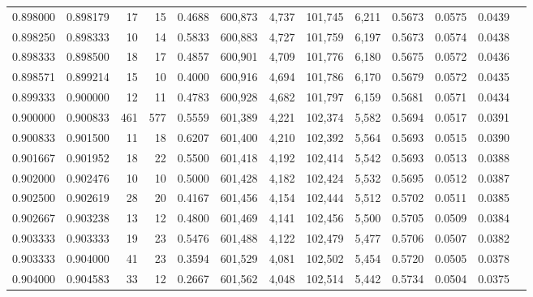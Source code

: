 \begin{tabular}{rrrrrrrrrrrrr}
0.898000 & 0.898179 &    17 &  15 &                                     0.4688 & 600,873 &   4,737 & 101,745 &   6,211 & 0.5673 & 0.0575 & 0.0439 \\
0.898250 & 0.898333 &    10 &  14 &                                     0.5833 & 600,883 &   4,727 & 101,759 &   6,197 & 0.5673 & 0.0574 & 0.0438 \\
0.898333 & 0.898500 &    18 &  17 &                                     0.4857 & 600,901 &   4,709 & 101,776 &   6,180 & 0.5675 & 0.0572 & 0.0436 \\
0.898571 & 0.899214 &    15 &  10 &                                     0.4000 & 600,916 &   4,694 & 101,786 &   6,170 & 0.5679 & 0.0572 & 0.0435 \\
0.899333 & 0.900000 &    12 &  11 &                                     0.4783 & 600,928 &   4,682 & 101,797 &   6,159 & 0.5681 & 0.0571 & 0.0434 \\
0.900000 & 0.900833 &   461 & 577 &                                     0.5559 & 601,389 &   4,221 & 102,374 &   5,582 & 0.5694 & 0.0517 & 0.0391 \\
0.900833 & 0.901500 &    11 &  18 &                                     0.6207 & 601,400 &   4,210 & 102,392 &   5,564 & 0.5693 & 0.0515 & 0.0390 \\
0.901667 & 0.901952 &    18 &  22 &                                     0.5500 & 601,418 &   4,192 & 102,414 &   5,542 & 0.5693 & 0.0513 & 0.0388 \\
0.902000 & 0.902476 &    10 &  10 &                                     0.5000 & 601,428 &   4,182 & 102,424 &   5,532 & 0.5695 & 0.0512 & 0.0387 \\
0.902500 & 0.902619 &    28 &  20 &                                     0.4167 & 601,456 &   4,154 & 102,444 &   5,512 & 0.5702 & 0.0511 & 0.0385 \\
0.902667 & 0.903238 &    13 &  12 &                                     0.4800 & 601,469 &   4,141 & 102,456 &   5,500 & 0.5705 & 0.0509 & 0.0384 \\
0.903333 & 0.903333 &    19 &  23 &                                     0.5476 & 601,488 &   4,122 & 102,479 &   5,477 & 0.5706 & 0.0507 & 0.0382 \\
0.903333 & 0.904000 &    41 &  23 &                                     0.3594 & 601,529 &   4,081 & 102,502 &   5,454 & 0.5720 & 0.0505 & 0.0378 \\
0.904000 & 0.904583 &    33 &  12 &                                     0.2667 & 601,562 &   4,048 & 102,514 &   5,442 & 0.5734 & 0.0504 & 0.0375 \\

\end{tabular}

